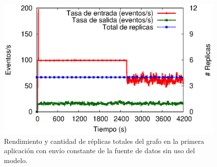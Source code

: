 \begin{figure}[!ht]
	\centering
	\includegraphics[scale=0.65]{images/exp/app1/uniform/sm/processSystem.eps}
    \caption{Rendimiento y cantidad de r\'eplicas totales del grafo en la primera aplicaci\'on con env\'io constante de la fuente de datos sin uso del modelo.}
	\label{fig:app1-uniform-processSystem-sm}
\end{figure}



%
%

